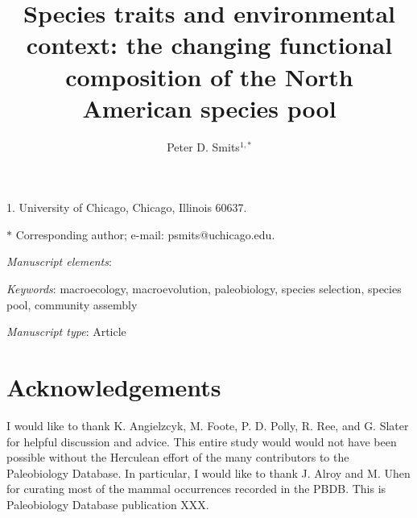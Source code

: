 \documentclass[11pt]{article}
\title{Species traits and environmental context: the changing functional composition of the North American species pool}
\author{Peter D. Smits$^{1, \ast}$\\}
\date{}
\begin{document}
\maketitle

\noindent{}1. University of Chicago, Chicago, Illinois 60637.

\noindent{}$\ast$ Corresponding author; e-mail: psmits@uchicago.edu.

\bigskip

\textit{Manuscript elements}:

\bigskip

\textit{Keywords}: macroecology, macroevolution, paleobiology, species selection, species pool, community assembly

\bigskip

\textit{Manuscript type}: Article

\bigskip


\linenumbers
\modulolinenumbers[2]

\newpage{}







%

%


\section*{Acknowledgements}
I would like to thank K. Angielzcyk, M. Foote, P. D. Polly, R. Ree, and G. Slater for helpful discussion and advice. This entire study would would not have been possible without the Herculean effort of the many contributors to the Paleobiology Database. In particular, I would like to thank J. Alroy and M. Uhen for curating most of the mammal occurrences recorded in the PBDB. This is Paleobiology Database publication XXX.




\end{document}
